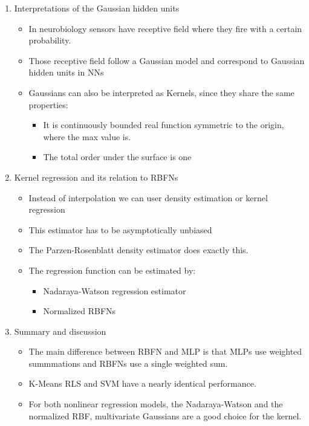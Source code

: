 \documentclass{scrartcl}
\begin{document}
\begin{enumerate}
\item Interpretations of the Gaussian hidden units
	\begin{itemize}
	\item In neurobiology sensors have receptive field where they fire with a certain probability.
	\item Those receptive field follow a Gaussian model and correspond to Gaussian hidden units in NNs
	\item Gaussians can also be interpreted as Kernels, since they share the same properties:
		\begin{itemize}
		\item It is continuously bounded real function symmetric to the origin, where the max value is.
		\item The total order under the surface is one
		\end{itemize}
	\end{itemize}
	
\item Kernel regression and its relation to RBFNs
	\begin{itemize}
	\item Instead of interpolation we can user density estimation or kernel regression
	\item This estimator has to be asymptotically unbiased
	\item The Parzen-Rosenblatt density estimator does exactly this.
	\item The regression function can be estimated by:
		\begin{itemize}
		\item Nadaraya-Watson regression estimator
		\item Normalized RBFNs
		\end{itemize}
	\end{itemize}
	
\item Summary and discussion
	\begin{itemize}
	\item The main difference between RBFN and MLP is that MLPs use weighted summmations and RBFNs use a single weighted sum.
	\item K-Means RLS and SVM have a nearly identical performance.
	\item For both nonlinear regression models, the Nadaraya-Watson and the normalized RBF, multivariate Gaussians are a good choice for the kernel.
	\end{itemize}
\end{enumerate}
\end{document}
